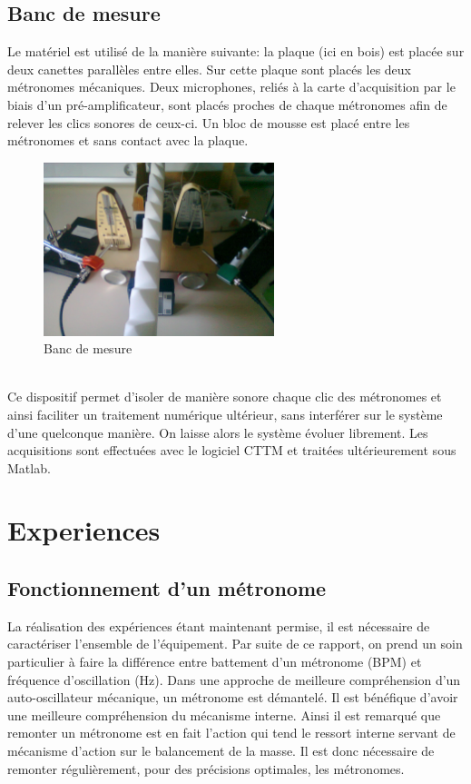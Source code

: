 \documentclass[a4paper,11pt]{report}
\begin{document}
\section{Banc de mesure}

Le matériel est utilisé de la manière suivante: la plaque (ici en bois) est placée sur deux canettes parallèles entre elles. Sur cette plaque sont placés les deux métronomes mécaniques. Deux microphones, reliés à la carte d'acquisition par le biais d'un pré-amplificateur, sont placés proches de chaque métronomes afin de relever les clics sonores de ceux-ci. Un bloc de mousse est placé entre les métronomes et sans contact avec la plaque.\\
\begin{figure}[h]
\centering
\includegraphics[width=0.6\textwidth]{BancMesure}
\caption{Banc de mesure}\label{Banc}
\end{figure}\\
Ce dispositif permet d'isoler de manière sonore chaque clic des métronomes et ainsi faciliter un traitement numérique ultérieur, sans interférer sur le système d'une quelconque manière. On laisse alors le système évoluer librement. Les acquisitions sont effectuées avec le logiciel CTTM et traitées ultérieurement sous Matlab.
\chapter{Experiences}
\section{Fonctionnement d'un métronome}
La réalisation des expériences étant maintenant permise, il est nécessaire de caractériser  l'ensemble de l'équipement. Par suite de ce rapport, on prend un soin particulier à faire la différence entre battement d'un métronome (BPM) et fréquence d'oscillation (Hz). Dans une approche de meilleure compréhension d'un auto-oscillateur mécanique, un métronome est  démantelé. Il est bénéfique d'avoir une meilleure compréhension du mécanisme interne. Ainsi il est remarqué que remonter un métronome est en fait l'action qui tend le ressort interne servant de mécanisme d'action sur le balancement de la masse. Il est donc nécessaire de remonter régulièrement, pour des précisions optimales, les métronomes.
\end{document}
